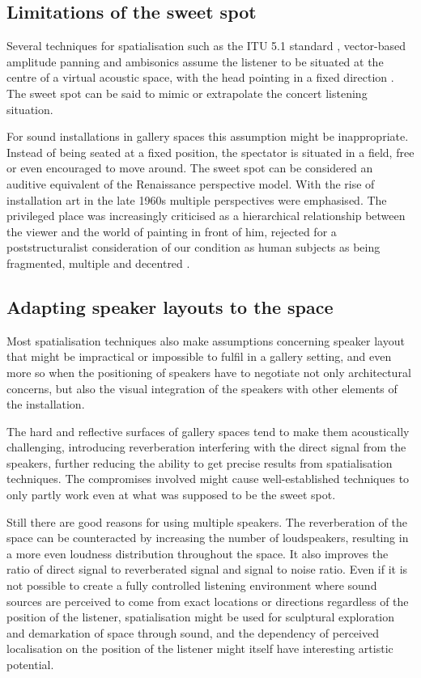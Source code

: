 \documentclass{article}
\begin{document}
\subsection{Limitations of the sweet spot}

Several techniques for spatialisation such as the ITU 5.1 standard \cite{ITU:1993_surround_5:1}, vector-based amplitude panning \cite{Pulkki:1997vbap} and ambisonics \cite{Gerzon:1985ambi_broadcast,Gerzon:1992metatheory} assume the listener to be situated at the centre of a virtual acoustic space, with the head pointing in a fixed direction \cite{Wishart:1996sonic_art}. The sweet spot can be said to mimic or extrapolate the concert listening situation.

For sound installations in gallery spaces this assumption might be inappropriate. Instead of being seated at a fixed position, the spectator is situated in a field, free or even encouraged to move around. The sweet spot can be considered an auditive equivalent of the Renaissance perspective model. With the rise of installation art in the late 1960s multiple perspectives were emphasised. The privileged place was increasingly criticised as a hierarchical relationship between the viewer and the world of painting in front of him, rejected for a poststructuralist consideration of our condition as human subjects as being fragmented, multiple and decentred \cite{Bishop:2005installation}.


\subsection{Adapting speaker layouts to the space}

Most spatialisation techniques also make assumptions concerning speaker layout that might be impractical or impossible to fulfil in a gallery setting, and even more so when the positioning of speakers have to negotiate not only architectural concerns, but also the visual integration of the speakers with other elements of the installation.

The hard and reflective surfaces of gallery spaces tend to make them acoustically challenging, introducing reverberation interfering with the direct signal from the speakers, further reducing the ability to get precise results from spatialisation techniques. The compromises involved might cause well-established techniques to only partly work even at what was supposed to be the sweet spot.

Still there are good reasons for using multiple speakers. The reverberation of the space can be counteracted by increasing the number of loudspeakers, resulting in a more even loudness distribution throughout the space. It also improves the ratio of direct signal to reverberated signal and signal to noise ratio. Even if it is not possible to create a fully controlled listening environment where sound sources are perceived to come from exact locations or directions regardless of the position of the listener, spatialisation might be used for sculptural exploration and demarkation of space through sound, and the dependency of perceived localisation on the position of the listener might itself have interesting artistic potential.
\end{document}
